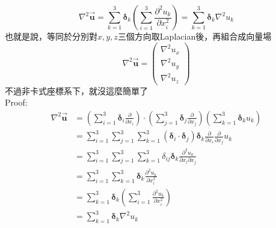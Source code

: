 \documentclass[../main.tex]{subfiles}
\begin{document}
\begin{itemize}
\begin{itemize}
\begin{equation}
          \nabla^2 \vec {\bm u} = \sum_{k=1}^3 \bm \delta_k \left(
            \sum_{i=1}^3 \frac{\partial^2 u_k}{\partial x_i^2}
          \right) = \sum_{k=1}^3 \bm \delta_k \nabla^2 u_k
        \end{equation}
        也就是說，等同於分別對$x,y,z$三個方向取Laplacian後，再組合成向量場
        \begin{equation}
          \nabla^2 \vec {\bm u}  = \begin{pmatrix}
            \nabla^2 u_x \\
            \nabla^2 u_y \\
            \nabla^2 u_z
          \end{pmatrix}
        \end{equation}
        不過非卡式座標系下，就沒這麼簡單了\\
        Proof:
        \begin{align}
          \nabla^2 \vec {\bm u} &=
          \left(
            \sum_{i=1}^3 \bm \delta_i \frac{\partial}{\partial x_i}
          \right) \cdot
          \left(
            \sum_{j=1}^3 \bm \delta_j \frac{\partial}{\partial x_j}
          \right)
          \left(
            \sum_{k=1}^3 \bm \delta_k u_k
          \right) \nonumber\\
          &= \sum_{i=1}^3 \sum_{j=1}^3 \sum_{k=1}^3
          \left(
            \bm \delta_i \cdot \bm \delta_j
          \right) \bm \delta_k
          \frac{\partial}{\partial x_i} \frac{\partial}{\partial x_j} u_k \nonumber\\
          &= \sum_{i=1}^3 \sum_{j=1}^3 \sum_{k=1}^3
          \delta_{ij} \bm \delta_k
          \frac{\partial^2 u_k}{\partial x_i \partial x_j} \nonumber\\
          &= \sum_{i=1}^3  \sum_{k=1}^3
          \bm \delta_k
          \frac{\partial^2 u_k}{\partial x_i^2} \nonumber\\
          &= \sum_{k=1}^3  \bm \delta_k
          \left(
            \sum_{i=1}^3
            \frac{\partial^2 u_k}{\partial x_i^2}
          \right) \nonumber\\
          &= \sum_{k=1}^3  \bm \delta_k
          \nabla^2 u_k
        \end{align}
    \end{itemize}
\end{itemize}
\end{document}
